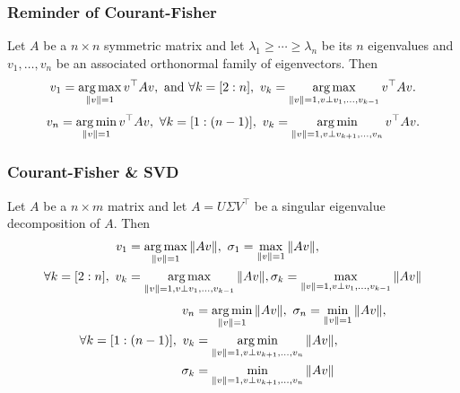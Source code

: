 \documentclass{beamer}
\begin{document}
\begin{frame}[t]
\frametitle{Reminder of Courant-Fisher}
\begin{theorem} 
Let $A$ be a $n \times n$ symmetric matrix and let $\lambda_1 \geq \cdots \geq \lambda_n$ be its $n$ eigenvalues and $v_1,\dots,v_n$ be an associated orthonormal family of eigenvectors. Then
\begin{align*}
v_1 = \argmax_{\|v\|=1} v^\top A v, \text{ and } \forall k = [2:n], \ v_k = \argmax_{\|v\|=1, v \perp v_1,\dots, v_{k-1}} v^\top A v.
\end{align*}
\begin{align*}
v_n = \operatorname*{arg\,min}_{\|v\|=1} v^\top A v, \ \forall k = [1:(n-1)], \ v_k = \operatorname*{arg\,min}_{\|v\|=1, v \perp v_{k+1},\dots, v_{n}} v^\top A v.
\end{align*}
\end{theorem}
\end{frame}

\begin{frame}[t]
\frametitle{Courant-Fisher \& SVD}
\begin{theorem} 
Let $A$ be a $n \times m$ matrix and let $A=U \Sigma V^\top$ be a singular eigenvalue decomposition of $A$. Then
\begin{align*}
v_1 &= \operatorname*{arg\,max}_{\|v\|=1} \|A v\|, \ \sigma_1 = \max_{\|v\|=1} \|A v\|, \\ \forall k = [2:n], \ v_k &= \operatorname*{arg\,max}_{\|v\|=1, v \perp v_1,\dots, v_{k-1}} \|A v\|,  \sigma_k = \max_{\|v\|=1, v \perp v_1,\dots, v_{k-1}} \|A v\|
\end{align*}
\begin{align*}
v_n &= \operatorname*{arg\,min}_{\|v\|=1} \|A v\|, \ \sigma_n = \min_{\|v\|=1} \|A v\|, \\ \forall k = [1:(n-1)], \ v_k &= \operatorname*{arg\,min}_{\|v\|=1, v \perp v_{k+1},\dots, v_{n}} \|A v\|, \\  \sigma_k &= \min_{\|v\|=1, v \perp v_{k+1},\dots, v_{n}} \|A v\|
\end{align*}
\end{theorem}
\end{frame}
\end{document}
